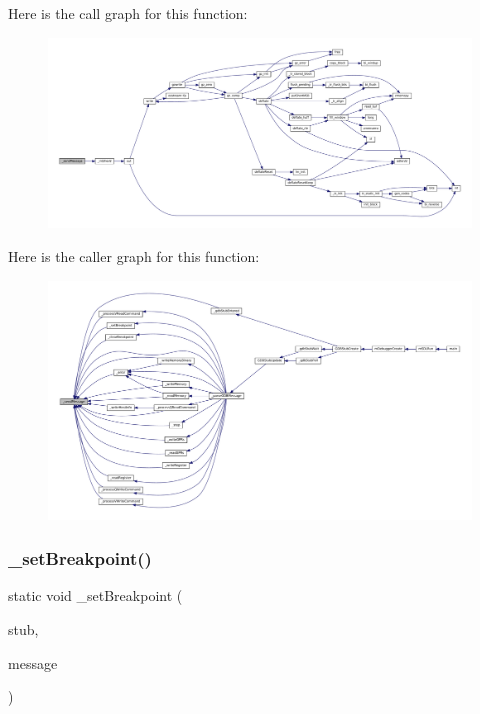 Here is the call graph for this function\+:
\nopagebreak
\begin{figure}[H]
\begin{center}
\leavevmode
\includegraphics[width=350pt]{gdb-stub_8c_abb9ab714ec89c5c39435215b2f48517c_cgraph}
\end{center}
\end{figure}
Here is the caller graph for this function\+:
\nopagebreak
\begin{figure}[H]
\begin{center}
\leavevmode
\includegraphics[width=350pt]{gdb-stub_8c_abb9ab714ec89c5c39435215b2f48517c_icgraph}
\end{center}
\end{figure}
\mbox{\label{gdb-stub_8c_a20d837c8c41a03d7d12d2af71302514f}} 
\subsubsection{\texorpdfstring{\+\_\+set\+Breakpoint()}{\_setBreakpoint()}}
{\footnotesize\ttfamily static void \+\_\+set\+Breakpoint (\begin{DoxyParamCaption}\item[{struct G\+D\+B\+Stub $\ast$}]{stub,  }\item[{const char $\ast$}]{message }\end{DoxyParamCaption})\hspace{0.3cm}{\ttfamily [static]}}

